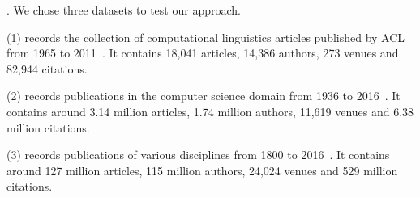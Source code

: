 
. We chose three datasets to test our approach.

\noindent
(1) \aan records the collection of computational linguistics articles published by ACL from 1965 to 2011~\cite{Liang16AAAI}.
It contains 18,041 articles, 14,386 authors, 273 venues and 82,944 citations.

\noindent
(2) \aminer records publications in the computer science domain from 1936 to 2016~\cite{Tang:08KDD}.
It contains around 3.14 million articles, 1.74 million authors, 11,619 venues and 6.38 million citations.

\noindent
(3) \magdata records publications of various disciplines from 1800 to 2016~\cite{Sinha15:MAG}.
It contains around 127 million articles, 115 million authors, 24,024 venues and 529 million citations.

